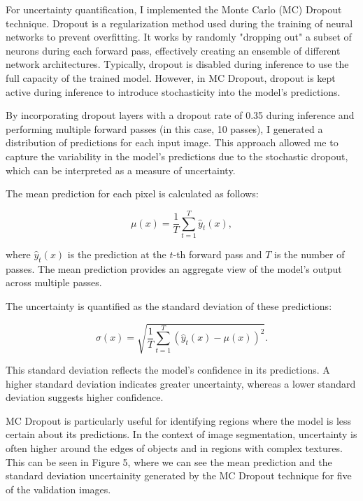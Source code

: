 \documentclass{article}
\begin{document}
For uncertainty quantification, I implemented the Monte Carlo (MC) Dropout technique. Dropout is a regularization method 
used during the training of neural networks to prevent overfitting. It works by randomly "dropping out" a subset of neurons 
during each forward pass, effectively creating an ensemble of different network architectures. Typically, dropout is 
disabled during inference to use the full capacity of the trained model. However, in MC Dropout, dropout is kept active 
during inference to introduce stochasticity into the model's predictions.

By incorporating dropout layers with a dropout rate of 0.35 during inference and performing multiple forward passes 
(in this case, 10 passes), I generated a distribution of predictions for each input image. This approach allowed me to 
capture the variability in the model's predictions due to the stochastic dropout, which can be interpreted as a measure of 
uncertainty.

The mean prediction for each pixel is calculated as follows:

\[
\mu(x) = \frac{1}{T} \sum_{t=1}^{T} \hat{y}_t(x),
\]

where \( \hat{y}_t(x) \) is the prediction at the \( t \)-th forward pass and \( T \) is the number of passes. The mean 
prediction provides an aggregate view of the model's output across multiple passes.

The uncertainty is quantified as the standard deviation of these predictions:

\[
\sigma(x) = \sqrt{\frac{1}{T} \sum_{t=1}^{T} (\hat{y}_t(x) - \mu(x))^2}.
\]

This standard deviation reflects the model's confidence in its predictions. A higher standard deviation indicates greater 
uncertainty, whereas a lower standard deviation suggests higher confidence. 

MC Dropout is particularly useful for identifying regions where the model is less certain about its predictions. In the 
context of image segmentation, uncertainty is often higher around the edges of objects and in regions with complex textures. 
This can be seen in Figure 5, where we can see the mean prediction and the standard deviation uncertainity generated by 
the MC Dropout technique for five of the validation images.
\end{document}

